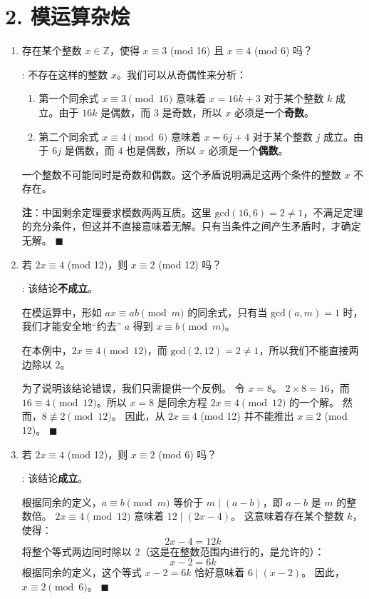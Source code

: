 \documentclass[11pt]{article}
\newenvironment{qparts}{\begin{enumerate}[{(}a{)}]}{\end{enumerate}}
\def\endproofmark{$\blacksquare$}
\newenvironment{proof}{\par\noindent{\bf 证明}:}{\endproofmark\smallskip}
\begin{document}
\section*{2. 模运算杂烩}
\begin{qparts}
\item 存在某个整数 $x\in\mathbb{Z}$，使得 $x\equiv3$ (mod 16) 且 $x\equiv4$ (mod 6) 吗？

\begin{proof}
不存在这样的整数 $x$。我们可以从奇偶性来分析：
\begin{enumerate}
    \item 第一个同余式 $x \equiv 3 \pmod{16}$ 意味着 $x = 16k + 3$ 对于某个整数 $k$ 成立。由于 $16k$ 是偶数，而 $3$ 是奇数，所以 $x$ 必须是一个\textbf{奇数}。
    \item 第二个同余式 $x \equiv 4 \pmod{6}$ 意味着 $x = 6j + 4$ 对于某个整数 $j$ 成立。由于 $6j$ 是偶数，而 $4$ 也是偶数，所以 $x$ 必须是一个\textbf{偶数}。
\end{enumerate}
一个整数不可能同时是奇数和偶数。这个矛盾说明满足这两个条件的整数 $x$ 不存在。

\textbf{注}：中国剩余定理要求模数两两互质。这里 $\text{gcd}(16, 6) = 2 \neq 1$，不满足定理的充分条件，但这并不直接意味着无解。只有当条件之间产生矛盾时，才确定无解。
\end{proof}

\item 若 $2x\equiv4$ (mod 12)，则 $x\equiv2$ (mod 12) 吗？

\begin{proof}
该结论\textbf{不成立}。

在模运算中，形如 $ax \equiv ab \pmod m$ 的同余式，只有当 $\text{gcd}(a, m) = 1$ 时，我们才能安全地“约去” $a$ 得到 $x \equiv b \pmod m$。

在本例中，$2x \equiv 4 \pmod{12}$，而 $\text{gcd}(2, 12) = 2 \neq 1$，所以我们不能直接两边除以 $2$。

为了说明该结论错误，我们只需提供一个反例。
令 $x=8$。
$2 \times 8 = 16$，而 $16 \equiv 4 \pmod{12}$。所以 $x=8$ 是同余方程 $2x \equiv 4 \pmod{12}$ 的一个解。
然而，$8 \not\equiv 2 \pmod{12}$。
因此，从 $2x\equiv4$ (mod 12) 并不能推出 $x\equiv2$ (mod 12)。
\end{proof}

\item 若 $2x\equiv4$ (mod 12)，则 $x\equiv2$ (mod 6) 吗？

\begin{proof}
该结论\textbf{成立}。

根据同余的定义，$a \equiv b \pmod m$ 等价于 $m \mid (a-b)$，即 $a-b$ 是 $m$ 的整数倍。
$2x \equiv 4 \pmod{12}$ 意味着 $12 \mid (2x - 4)$。
这意味着存在某个整数 $k$，使得：
\[ 2x - 4 = 12k \]
将整个等式两边同时除以 $2$（这是在整数范围内进行的，是允许的）：
\[ x - 2 = 6k \]
根据同余的定义，这个等式 $x-2=6k$ 恰好意味着 $6 \mid (x-2)$。
因此，$x \equiv 2 \pmod{6}$。
\end{proof}
\end{qparts}
\end{document}
